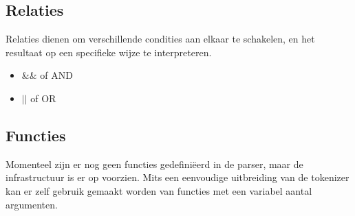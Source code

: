 \subsection{Relaties}

Relaties dienen om verschillende condities aan elkaar te schakelen, en het resultaat op een specifieke wijze te interpreteren.

\begin{itemize}
\item \&\& of AND
\item $||$ of OR
\end{itemize}

\subsection{Functies}

Momenteel zijn er nog geen functies gedefini\"eerd in de parser, maar de infrastructuur is er op voorzien. Mits een eenvoudige uitbreiding van de tokenizer kan er zelf gebruik gemaakt worden van functies met een variabel aantal argumenten.
